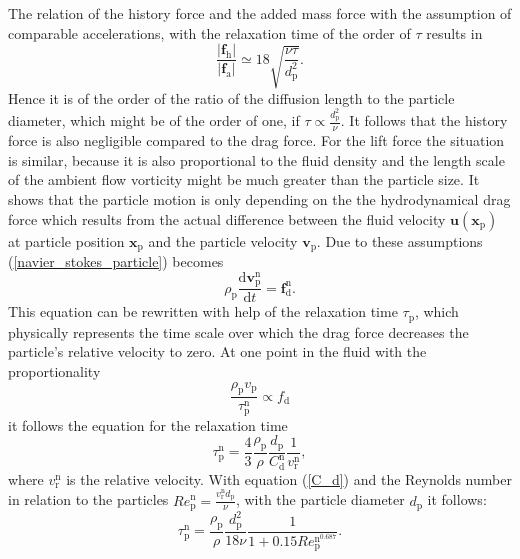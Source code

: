 \documentclass[11pt,a4paper,openany,oneside,parskip=half*]{article}
\renewcommand*\vec[1]{\boldsymbol{#1}}
\begin{document}
The relation of the history force and the added mass force with the assumption of comparable accelerations, with the relaxation time of the order of $\tau$ results in
\begin{equation}
\frac{|\vec{f}_\mathrm{h}|}{|\vec{f}_\mathrm{a}|}\simeq 18 \sqrt{\frac{\nu\tau}{d_\mathrm{p}^\mathrm{2}}}.
\end{equation}
Hence it is of the order of the ratio of the diffusion length to the particle diameter, which might be of the order of one, if $\tau \propto \frac{d_\mathrm{p}^\mathrm{2}}{\nu}$.
It follows that the history force is also negligible compared to the drag force.
For the lift force the situation is similar, because it is also proportional to the fluid density and the length scale of the ambient flow vorticity might be much greater than the particle size.
It shows that the particle motion is only depending on the the hydrodynamical drag force which results from the actual difference between the fluid velocity $\vec{u}(\vec{x}_\mathrm{p})$ at particle position $\vec{x}_\mathrm{p}$ and the particle velocity $\vec{v}_\mathrm{p}$.
Due to these assumptions (\ref{navier_stokes_particle}) becomes
\begin{equation}
\rho_\mathrm{p}\frac{\mathrm{d}\vec{v}_\mathrm{p}^\mathrm{n}}{\mathrm{d}t} = \vec{f}_\mathrm{d}^\mathrm{n}.
\end{equation}
This equation can be rewritten with help of the relaxation time $\tau_\mathrm{p}$, which physically represents the time scale over which the drag force decreases the particle's relative velocity to zero. At one point in the fluid with the proportionality 
\begin{equation}
\frac{\rho_\mathrm{p} v_\mathrm{p}}{\tau_\mathrm{p}^\mathrm{n}} \propto f_\mathrm{d}
\end{equation} 
it follows the equation for the relaxation time
\begin{equation}
\tau_\mathrm{p}^\mathrm{n} = \frac{4}{3}\frac{\rho_\mathrm{p}}{\rho} \frac{d_\mathrm{p}}{C_\mathrm{d}^\mathrm{n}}\frac{1}{v_\mathrm{r}^\mathrm{n}},
\end{equation}
where $v_\mathrm{r}^\mathrm{n}$ is the relative velocity. 
With equation (\ref{C_d}) and the Reynolds number in relation to the particles $Re_\mathrm{p}^\mathrm{n}=\frac{v_\mathrm{r}^\mathrm{n}d_\mathrm{p}}{\nu}$, with the particle diameter $d_\mathrm{p}$ it follows:
\begin{equation}
\tau_\mathrm{p}^\mathrm{n} = \frac{\rho_\mathrm{p}}{\rho}\frac{d_\mathrm{p}^2}{18\nu}\frac{1}{1+0.15Re_\mathrm{p}^\mathrm{n^\mathrm{0.687}}}.
\end{equation} 
\end{document}
